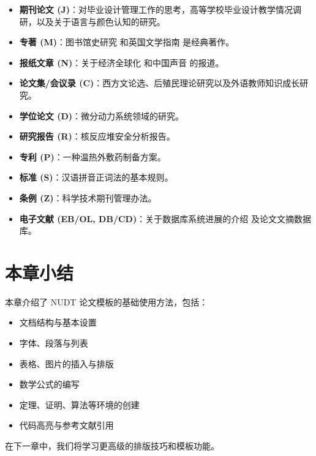 \begin{itemize}
  \item \textbf{期刊论文 (J)}：对毕业设计管理工作的思考\cite{Zhou2003}，高等学校毕业设计教学情况调研\cite{Xia2004}，以及关于语言与颜色认知的研究\cite{Heider1999}。
  \item \textbf{专著 (M)}：图书馆史研究\cite{Liu1979} 和英国文学指南\cite{Gill1985} 是经典著作。
  \item \textbf{报纸文章 (N)}：关于经济全球化\cite{Li1998} 和中国声音\cite{French1987} 的报道。
  \item \textbf{论文集/会议录 (C)}：西方文论选\cite{Wu1979}、后殖民理论研究\cite{Spivak1988}以及外语教师知识成长研究\cite{Almarza1996}。
  \item \textbf{学位论文 (D)}：微分动力系统领域的研究\cite{Zhang1983}。
  \item \textbf{研究报告 (R)}：核反应堆安全分析报告\cite{Feng1997}。
  \item \textbf{专利 (P)}：一种温热外敷药制备方案\cite{Jiang1989}。
  \item \textbf{标准 (S)}：汉语拼音正词法的基本规则\cite{GB16159-1996}。
  \item \textbf{条例 (Z)}：科学技术期刊管理办法\cite{SSTC1991}。
  \item \textbf{电子文献 (EB/OL, DB/CD)}：关于数据库系统进展的介绍\cite{Wang1998} 及论文文摘数据库\cite{Wan1996}。
\end{itemize}

\section{本章小结}
本章介绍了 NUDT 论文模板的基础使用方法，包括：
\begin{itemize}
  \item 文档结构与基本设置
  \item 字体、段落与列表
  \item 表格、图片的插入与排版
  \item 数学公式的编写
  \item 定理、证明、算法等环境的创建
  \item 代码高亮与参考文献引用
\end{itemize}

在下一章中，我们将学习更高级的排版技巧和模板功能。